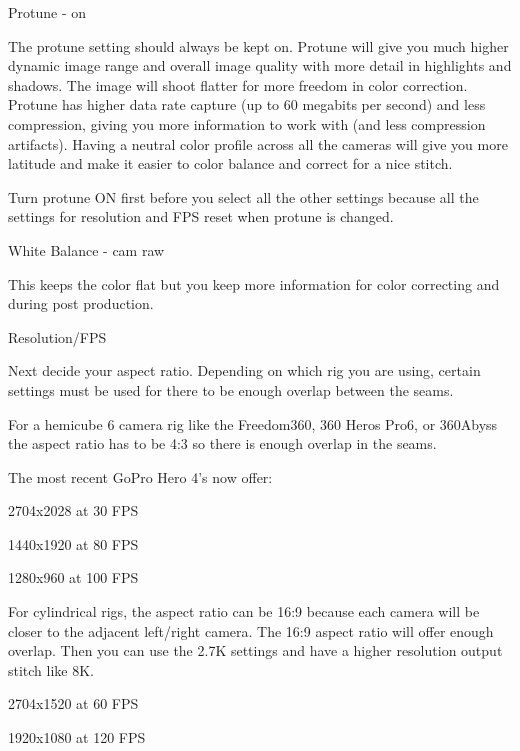 \begin{fullwidth}
{\large Protune - on \par}


The protune setting should always be kept on. Protune will give you much higher dynamic image range and overall image quality with more detail in highlights and shadows. The image will shoot flatter for more freedom in color correction. Protune has higher data rate capture (up to 60 megabits per second) and less compression, giving you more information to work with (and less compression artifacts). Having a neutral color profile across all the cameras will give you more latitude and make it easier to color balance and correct for a nice stitch. 

\tip Turn protune ON first before you select all the other settings because all the settings for resolution and FPS reset when protune is changed.

\clearpage
{\large White Balance - cam raw \par} 


This keeps the color flat but you keep more information for color correcting and \textbf{} during post production.

{\large Resolution/FPS \par}

Next decide your aspect ratio. Depending on which rig you are using, certain settings must be used for there to be enough overlap between the seams. 

For a hemicube 6 camera rig like the Freedom360, 360 Heros Pro6, or 360Abyss the aspect ratio has to be 4:3 so there is enough overlap in the seams. 

The most recent GoPro Hero 4's now offer:

2704x2028 at 30 FPS

1440x1920 at 80 FPS

\clearpage
1280x960 at 100 FPS


For cylindrical rigs, the aspect ratio can be 16:9 because each camera will be closer to the adjacent left/right camera. The 16:9 aspect ratio will offer enough overlap. Then you can use the 2.7K settings and have a higher resolution output stitch like 8K. 

2704x1520 at 60 FPS


\clearpage
1920x1080 at 120 FPS


\end{fullwidth}
